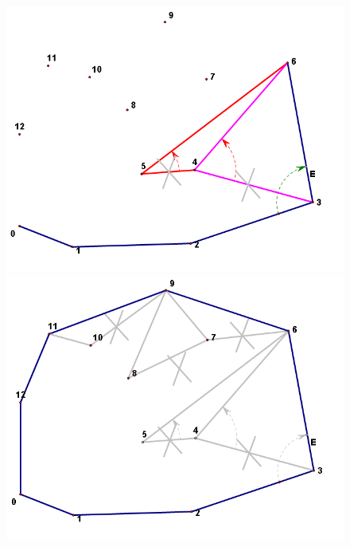 \documentclass[notheorems,serif,table,compress]{beamer}  %
\begin{document}
\begin{frame}
\begin{itemize}
\begin{figure}
\begin{minipage}[t]{0.35\linewidth}
              \end{minipage}
            \end{figure}
            \pause
            \begin{figure}
              \centering
              \begin{minipage}[t]{0.35\linewidth}
              \includegraphics[width=1\linewidth]{gra3}
              \end{minipage}
              \pause
              \begin{minipage}[t]{0.35\linewidth}
              \includegraphics[width=1\linewidth]{gra4}
              \end{minipage}
            \end{figure}
    \end{itemize}
\end{frame}
\end{document}
